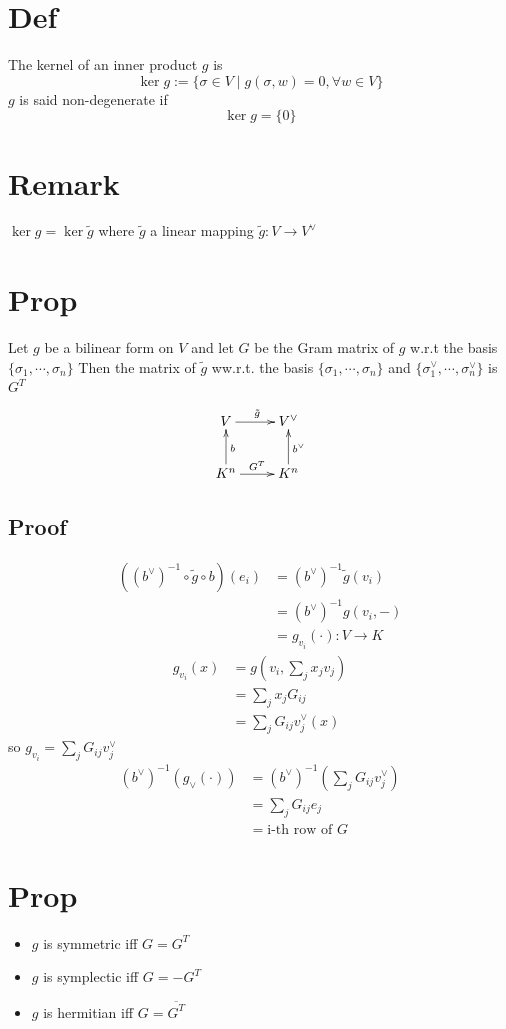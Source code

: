 \documentclass{book}
\begin{document}
\section{Def}
The kernel of an inner product $g$ is 
$$\ker{g}:=\{\sigma\in V\mid g(\sigma,w)=0,\forall w\in V\}$$
$g$ is said non-degenerate if $$\ker{g}=\{0\}$$
\section{Remark}
$\ker g=\ker\tilde{g}$ where $\tilde{g}$ a linear mapping $\tilde{g}:V\rightarrow V^\vee$
\section{Prop}
Let $g$ be a bilinear form on $V$ and let $G$ be the Gram matrix of $g$ w.r.t the basis $\{\sigma_1,\cdots,\sigma_n\}$ Then the matrix of $\tilde{g}$ ww.r.t. the basis $\{\sigma_1,\cdots,\sigma_n\}$ and $\{\sigma^\vee_1,\cdots,\sigma^\vee_n\}$ is $G^T$
$$\xymatrix{
    V\ar[r]^{\tilde{g}} &V^\vee\\
    K^n\ar[u]_{b}\ar[r]^{G^T}&K^n\ar[u]_{b^\vee}
}$$
\subsection*{Proof}
$$\begin{aligned}
    ((b^\vee)^{-1}\circ\tilde{g}\circ b)(e_i) &=(b^\vee)^{-1}\tilde{g}(v_i)\\
    &=(b^\vee)^{-1}g(v_i,-)\\
    &=g_{v_i}(\cdot):V\rightarrow K
\end{aligned}$$
$$\begin{aligned}
    g_{v_i}(x)&=g(v_i,\sum\limits_jx_jv_j)\\
    &=\sum\limits_jx_jG_{ij}\\
    &=\sum\limits_jG_{ij}v_j^\vee(x)
\end{aligned}$$
so $g_{v_i}=\sum\limits_jG_{ij}v_j^\vee$
$$\begin{aligned}
    (b^\vee)^{-1}(g_\vee(\cdot))&=(b^\vee)^{-1}(\sum\limits_jG_{ij}v_j^\vee)\\
    &=\sum\limits_jG_{ij}e_j\\
    &=\text{i-th row of }G
\end{aligned}$$
\section{Prop}\begin{itemize}
    \item $g$ is symmetric iff $G=G^T$
    \item $g$ is symplectic iff $G=-G^T$
    \item $g$ is hermitian iff $G=\overline{G^T}$
\end{itemize}
\end{document}

